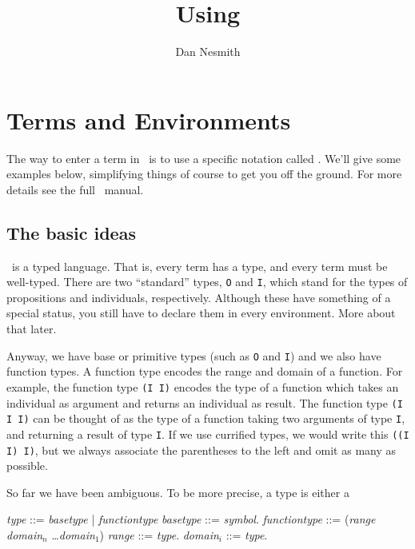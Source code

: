 

\title{Using \protect{\keim}}
\author{Dan Nesmith}


\maketitle

\section{Terms and Environments}

The way to enter a term in \keim\ is to use a specific notation called
\post.  We'll give some examples below, simplifying things of course to
get you off the ground.  
For more details see the
full \keim\ manual.  

\subsection{The basic ideas}

\post\ is a typed language.  That is, every term has a type, and every
term must be well-typed.  There are two ``standard'' types, {\tt O} and
{\tt I}, which stand for the types of propositions and individuals,
respectively.  Although these have something of a special status, you
still have to declare them in every environment.  More about that later.

Anyway, we have base or primitive types (such as {\tt O} and {\tt I}) and
we also have function types.  A function type encodes the range and domain
of a function.  For example, the function type {\tt (I I)} encodes the
type of a function which takes an individual as argument and returns an
individual as result.  The function type {\tt (I I I)} can be thought of
as the type of a function taking two arguments of type {\tt I}, and returning
a result of type {\tt I}.   If we use currified types, we would write this
{\tt ((I I) I)}, but we always associate the parentheses to the left and
omit as many as possible.  

So far we have been ambiguous.  To be more precise, a type is either a
\begin{code}
{\it type} ::= {\it basetype} | {\it functiontype}
{\it basetype} ::= {\it symbol}.
{\it functiontype} ::= ({\it range} {\it domain\(_n\)} \ldots {\it domain\(_1\)})
{\it range} ::= {\it type}.
{\it domain\(_i\)} ::= {\it type}.
\end{code}

